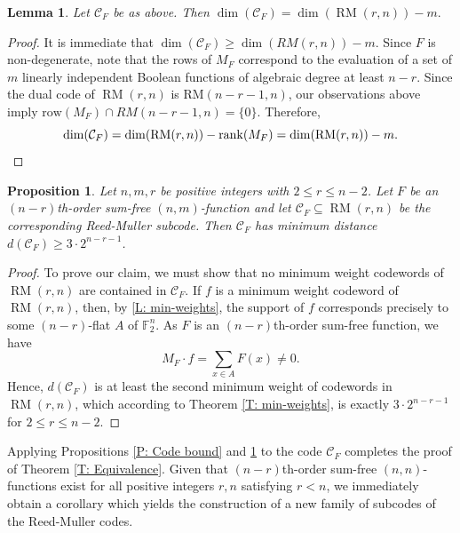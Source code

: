 \documentclass[12pt]{article}
\newtheorem{lem}[thm]{Lemma}
\newtheorem{prop}[thm]{Proposition}
\theoremstyle{definition}
\newcommand{\F}{\mathbb F}
\DeclareMathOperator{\RM}{RM}
\begin{document}
\begin{lem}
    Let $\mathcal{C}_F$ be as above. Then
    $
    \dim(\mathcal{C}_F) = \dim(\RM(r, n)) - m.
    $
\end{lem}

\begin{proof}
     It is immediate that $\dim(\mathcal{C}_F) \geq \dim(RM(r, n)) - m$. Since $F$ is non-degenerate, note that the rows of $M_F$ correspond to the evaluation of a set of $m$ linearly independent Boolean functions of algebraic degree at least $n - r$. Since the dual code of $\RM(r,n)$ is RM$(n - r- 1, n)$, our observations above imply $\text{row}(M_F)\cap RM(n-r-1, n) = \{0 \}$. Therefore,
     \begin{equation*}
    \dim(\mathcal{C}_F)
    = \dim(\RM(r, n)) - \operatorname{rank}(M_F)
    = \dim(\RM(r, n)) - m.
    \qedhere
\end{equation*}
\end{proof}



\begin{prop}\label{P: New Code}
    Let $n, m, r$ be positive integers with $2 \leq r \leq n-2$. Let $F$ be an $(n-r)$th-order sum-free $(n, m)$-function and let $\mathcal{C}_F \subseteq \RM(r, n)$ be the corresponding Reed-Muller subcode. Then $\mathcal{C}_F$ has minimum distance $d(\mathcal{C}_F) \geq 3\cdot 2^{n-r - 1}$. 
\end{prop}

\begin{proof}
     To prove our claim, we must show that no minimum weight codewords of $\RM(r, n)$ are contained in $\mathcal{C}_F$.  If $f$ is a minimum weight codeword of $\RM(r, n)$, then, by \cref{L: min-weights}, the support of $f$ corresponds precisely to some $(n-r)$-flat $A$ of $\F_2^n$. As $F$ is an $(n-r)$th-order sum-free function, we have
$$
 M_F\cdot f = \sum_{x\in A}F(x) \neq 0.
$$
 Hence, $d(\mathcal{C}_F)$ is at least the second minimum weight of codewords in $\RM(r,n)$, which according to Theorem \ref{T: min-weights}, is exactly $3\cdot2^{n - r - 1}$ for $2 \leq r \leq n-2$.
\end{proof}


 Applying Propositions \ref{P: Code bound} and \ref{P: New Code} to the code $\mathcal{C}_F$ completes the proof of Theorem \ref{T: Equivalence}.    
 Given that $(n-r)$th-order sum-free $(n,n)$-functions exist for all positive integers $r, n$ satisfying $r < n$, we immediately obtain a corollary which yields the construction of a new family of subcodes of the Reed-Muller codes.
\end{document}
